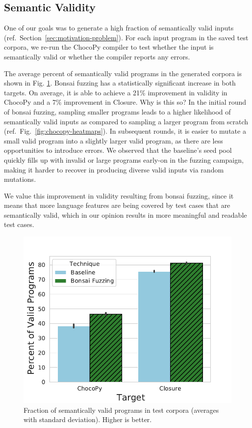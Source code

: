 \documentclass[conference]{IEEEtran}
\newcommand{\tech}{bonsai fuzzing} \newcommand{\Tech}{Bonsai fuzzing} \newcommand{\TECH}{Bonsai Fuzzing}
\begin{document}
\subsection{Semantic Validity}

One of our goals was to generate a high fraction of semantically valid inputs (ref.~Section~\ref{sec:motivation-problem}). For each input program in the saved test corpora, we re-run the ChocoPy compiler to test whether the input is semantically valid or whether the compiler reports any errors.

The average percent of semantically valid programs in the generated corpora is shown in Fig. \ref{fig:validity}. \Tech{} has a statistically significant increase in both targets. On average, it is able to achieve a 21\% improvement in validity in ChocoPy and a 7\% improvement in Closure.  Why is this so? In the initial round of \tech{}, sampling smaller programs leads to a higher likelihood of semantically valid inputs as compared to sampling a larger program from scratch (ref.~Fig.~\ref{fig:chocopy-heatmaps}). In subsequent rounds, it is easier to mutate a small valid program into a slightly larger valid program, as there are less opportunities to introduce errors. We observed that the baseline's seed pool quickly fills up with invalid or large programs early-on in the fuzzing campaign, making it harder to recover in producing diverse valid inputs via random mutations.

We value this improvement in validity resulting from \tech{}, since it means that more language features are being covered by test cases that are semantically valid, which in our opinion results in more meaningful and readable test cases.
\begin{figure}[t]
    \centering
    \includegraphics[scale=0.5]{validity.pdf}
    \caption{Fraction of semantically valid programs in test corpora (averages with standard deviation). Higher is better.}
    \label{fig:validity}
    \vspace{-0.3cm}
\end{figure}
\end{document}
